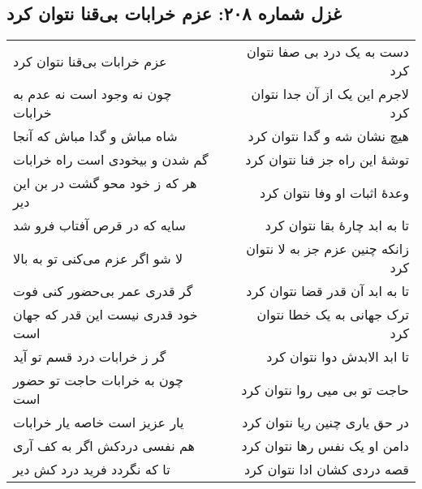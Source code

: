 \begin{center}
\section*{غزل شماره ۲۰۸: عزم خرابات بی‌قنا نتوان کرد}
\label{sec:208}
\begin{longtable}{l p{0.5cm} r}
عزم خرابات بی‌قنا نتوان کرد
&&
دست به یک درد بی صفا نتوان کرد
\\
چون نه وجود است نه عدم به خرابات
&&
لاجرم این یک از آن جدا نتوان کرد
\\
شاه مباش و گدا مباش که آنجا
&&
هیچ نشان شه و گدا نتوان کرد
\\
گم شدن و بیخودی است راه خرابات
&&
توشهٔ این راه جز فنا نتوان کرد
\\
هر که ز خود محو گشت در بن این دیر
&&
وعدهٔ اثبات او وفا نتوان کرد
\\
سایه که در قرص آفتاب فرو شد
&&
تا به ابد چارهٔ بقا نتوان کرد
\\
لا شو اگر عزم می‌کنی تو به بالا
&&
زانکه چنین عزم جز به لا نتوان کرد
\\
گر قدری عمر بی‌حضور کنی فوت
&&
تا به ابد آن قدر قضا نتوان کرد
\\
خود قدری نیست این قدر که جهان است
&&
ترک جهانی به یک خطا نتوان کرد
\\
گر ز خرابات درد قسم تو آید
&&
تا ابد الابدش دوا نتوان کرد
\\
چون به خرابات حاجت تو حضور است
&&
حاجت تو بی میی روا نتوان کرد
\\
یار عزیز است خاصه یار خرابات
&&
در حق یاری چنین ریا نتوان کرد
\\
هم نفسی دردکش اگر به کف آری
&&
دامن او یک نفس رها نتوان کرد
\\
تا که نگردد فرید درد کش دیر
&&
قصه دردی کشان ادا نتوان کرد
\\
\end{longtable}
\end{center}
